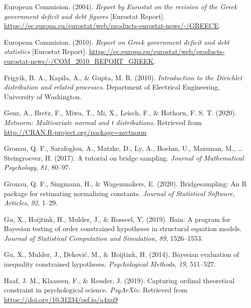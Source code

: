 \documentclass[
  english,
  man,floatsintext]{apa6}
\begin{document}
\leavevmode\hypertarget{ref-europeanCommision2004}{}%
European Commision. (2004). \emph{Report by Eurostat on the revision of the Greek government deficit and debt figures} {[}Eurostat Report{]}. \url{https://ec.europa.eu/eurostat/web/products-eurostat-news/-/GREECE}.

\leavevmode\hypertarget{ref-europeanCommision2010}{}%
European Commision. (2010). \emph{Report on Greek government deficit and debt statistics} {[}Eurostat Report{]}. \url{https://ec.europa.eu/eurostat/web/products-eurostat-news/-/COM_2010_REPORT_GREEK}.

\leavevmode\hypertarget{ref-frigyik2010introduction}{}%
Frigyik, B. A., Kapila, A., \& Gupta, M. R. (2010). \emph{Introduction to the Dirichlet distribution and related processes}. Department of Electrical Engineering, University of Washington.

\leavevmode\hypertarget{ref-mvtnorm}{}%
Genz, A., Bretz, F., Miwa, T., Mi, X., Leisch, F., \& Hothorn, F. S. T. (2020). \emph{Mvtnorm: Multivariate normal and t distributions}. Retrieved from \url{http://CRAN.R-project.org/package=mvtnorm}

\leavevmode\hypertarget{ref-gronau2017tutorial}{}%
Gronau, Q. F., Sarafoglou, A., Matzke, D., Ly, A., Boehm, U., Marsman, M., \ldots{} Steingroever, H. (2017). A tutorial on bridge sampling. \emph{Journal of Mathematical Psychology}, \emph{81}, 80--97.

\leavevmode\hypertarget{ref-gronau2017bridgesampling}{}%
Gronau, Q. F., Singmann, H., \& Wagenmakers, E. (2020). Bridgesampling: An R package for estimating normalizing constants. \emph{Journal of Statistical Software, Articles}, \emph{92}, 1--29.

\leavevmode\hypertarget{ref-gu2019bain}{}%
Gu, X., Hoijtink, H., Mulder, J., \& Rosseel, Y. (2019). Bain: A program for Bayesian testing of order constrained hypotheses in structural equation models. \emph{Journal of Statistical Computation and Simulation}, \emph{89}, 1526--1553.

\leavevmode\hypertarget{ref-gu2014bayesian}{}%
Gu, X., Mulder, J., Deković, M., \& Hoijtink, H. (2014). Bayesian evaluation of inequality constrained hypotheses. \emph{Psychological Methods}, \emph{19}, 511--527.

\leavevmode\hypertarget{ref-haaf2019capturngPreprint}{}%
Haaf, J. M., Klaassen, F., \& Rouder, J. (2019). Capturing ordinal theoretical constraint in psychological science. \emph{PsyArXiv}. Retrieved from \url{https://doi.org/10.31234/osf.io/a4xu9}
\end{document}

